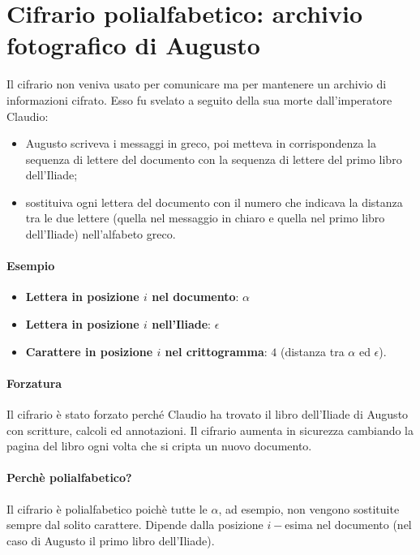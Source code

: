 \section{Cifrario polialfabetico: archivio fotografico di Augusto}
Il cifrario non veniva usato per comunicare ma per mantenere un archivio di informazioni cifrato. Esso fu svelato a seguito della sua morte dall'imperatore Claudio:
\begin{itemize}
    \item Augusto scriveva i messaggi in greco, poi metteva in corrispondenza la sequenza di lettere del documento con la sequenza di lettere del primo libro dell'Iliade;
    \item sostituiva ogni lettera del documento con il numero che indicava la distanza tra le due lettere (quella nel messaggio in chiaro e quella nel primo libro dell'Iliade) nell'alfabeto greco.
\end{itemize}
\paragraph{Esempio}
\begin{itemize}
	\item \textbf{Lettera in posizione $i$ nel documento}: $\alpha$
	\item \textbf{Lettera in posizione $i$ nell'Iliade}: $\epsilon$
	\item \textbf{Carattere in posizione $i$ nel crittogramma}: $4$ (distanza tra $\alpha$ ed $\epsilon$).
\end{itemize}
\paragraph{Forzatura} Il cifrario è stato forzato perché Claudio ha trovato il libro dell'Iliade di Augusto con scritture, calcoli ed annotazioni. Il cifrario aumenta in sicurezza cambiando la pagina del libro ogni volta che si cripta un nuovo documento.
\paragraph{Perchè polialfabetico?} Il cifrario è polialfabetico poichè tutte le $\alpha$, ad esempio, non vengono sostituite sempre dal solito carattere. Dipende dalla posizione $i-$esima nel documento (nel caso di Augusto il primo libro dell'Iliade).

